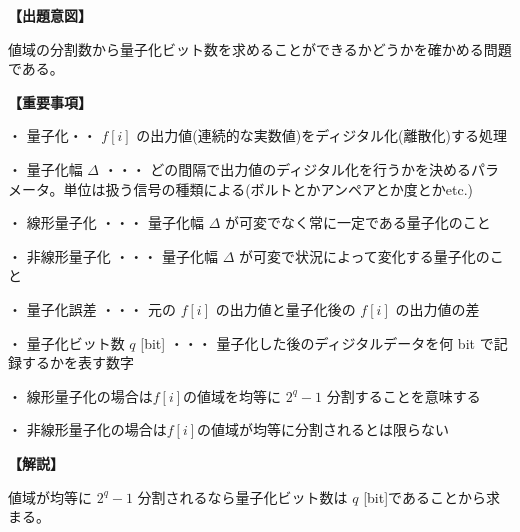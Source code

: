 \noindent \textbf{【出題意図】}

\noindent 値域の分割数から量子化ビット数を求めることができるかどうかを確かめる問題である。

\vspace{1em}
\noindent \textbf{【重要事項】}

\medskip
\noindent ・ 量子化・・ $f[i]$ の出力値(連続的な実数値)をディジタル化(離散化)する処理

\medskip
\noindent ・ 量子化幅 $\Delta$ ・・・ どの間隔で出力値のディジタル化を行うかを決めるパラメータ。単位は扱う信号の種類による(ボルトとかアンペアとか度とかetc.)

\medskip
\noindent ・ 線形量子化 ・・・ 量子化幅  $\Delta$ が可変でなく常に一定である量子化のこと

\medskip
\noindent ・ 非線形量子化 ・・・ 量子化幅  $\Delta$ が可変で状況によって変化する量子化のこと

\medskip
\noindent ・ 量子化誤差 ・・・ 元の $f[i]$ の出力値と量子化後の $f[i]$ の出力値の差

\medskip
\noindent ・ 量子化ビット数 $q$ [bit] ・・・ 量子化した後のディジタルデータを何 bit で記録するかを表す数字

\medskip
\noindent ・ 線形量子化の場合は$f[i]$の値域を均等に $2^q-1$ 分割することを意味する

\medskip
\noindent ・ 非線形量子化の場合は$f[i]$の値域が均等に分割されるとは限らない

\vspace{1em}
\noindent \textbf{【解説】}

\noindent 値域が均等に $2^q-1$ 分割されるなら量子化ビット数は $q$ [bit]であることから求まる。

